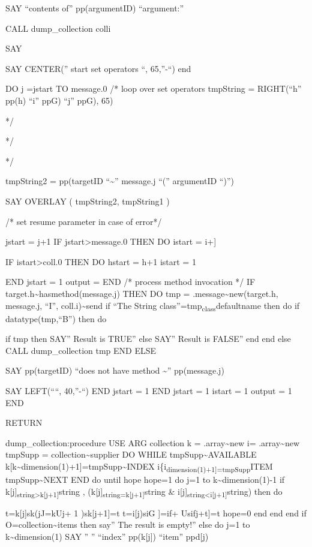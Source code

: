 SAY ``contents of'' pp(argumentID) ``argument:''

CALL dump\_collection colli

SAY

SAY CENTER('' start set operators ``, 65,''-``) end

DO j =jstart TO message.0 /* loop over set operators tmpString
\textbar{} = RIGHT(``h'' pp(h) ``i'' ppG) ``j'' ppG), 65)

*/

*/

*/

tmpString2 = pp(targetID ``\textasciitilde{}'' message.j
\textbar\textbar{} ``('' argumentID ``)'')

SAY OVERLAY ( tmpString2, tmpString1 )

/* set resume parameter in case of error*/

jstart = j+1 IF jstart\textgreater message.0 THEN DO istart = i+{]}

IF istart\textgreater coll.0 THEN DO hstart = h+1 istart = 1

END jstart = 1 output = \textbar{} END /* process method invocation */
IF target.h\textasciitilde hasmethod(message.j) THEN DO tmp =
.message\textasciitilde new(target.h, message.j, ``I'',
coll.i)\textasciitilde send if ``The String
class''=tmp\textsubscript{class}defaultname then do if
datatype(tmp,``B'') then do

if tmp then SAY'' Result is TRUE'' else SAY'' Result is FALSE'' end end
else CALL dump\_collection tmp END ELSE

SAY pp(targetID) ``does not have method \textasciitilde{}''
pp(message.j)

SAY LEFT(````, 40,''-``) END jstart = 1 END jstart = 1 istart = 1 output
= 1 END

RETURN

dump\_collection:procedure USE ARG collection k =
.array\textasciitilde new i= .array\textasciitilde new tmpSupp =
collection\textasciitilde supplier DO WHILE
tmpSupp\textasciitilde AVAILABLE
k{[}k\textasciitilde dimension(1)+1{]}=tmpSupp\textasciitilde INDEX
i\{i\textsubscript{dimension(1)+1{]}=tmpSupp}ITEM
tmpSupp\textasciitilde NEXT END do until hope hope=1 do j=1 to
k\textasciitilde dimension(1)-1 if
k{[}j{]}\textsubscript{string\textgreater k{[}j+1{]}}string \textbar,
(k{[}j{]}\textsubscript{string=k{[}j+1{]}}string \&
i{[}j{]}\textsubscript{string\textless i{[}j+1{]}}string) then do

t=k{[}j{]}sk(jJ=kUj+ 1 )sk{[}j+1{]}=t t=i{[}j)siG {]}=if+ Usifj+t{]}=t
hope=0 end end end if O=collection\textasciitilde items then say'' The
result is empty!'' else do j=1 to k\textasciitilde dimension(1) SAY ''
'' ``index'' pp(k{[}j{]}) ``item'' ppd{[}j)

